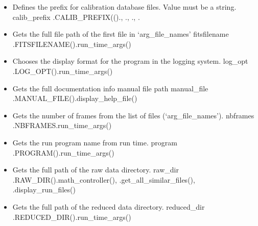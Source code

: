 \begin{itemize}
\item {}
{Defines the prefix for calibration database files. Value must be a string.}
{calib\_prefix}
{\AllRecipes}{\spirouConst.CALIB\_PREFIX(()}{\calDARK.\progMAIN, \callocRAW.\progMAIN, \calSLIT.\progMAIN, \calFFraw.\progMAIN}


\item {}
{Gets the full file path of the first file in `arg\_file\_names'}
{fitsfilename}
{\AllRecipes}{\spirouConst.FITSFILENAME()}{\spirouStartup.run\_time\_args()}


\item {}
{Chooses the display format for the program in the logging system.}
{log\_opt}
{\AllRecipes}{\spirouConst.LOG\_OPT()}{\spirouStartup.run\_time\_args()}


\item {}
{Gets the full documentation info manual file path}
{manual\_file}
{\AllRecipes}{\spirouConst.MANUAL\_FILE()}{\spirouStartup.display\_help\_file()}


\item {}
{Gets the number of frames from the list of files (`arg\_file\_names').}
{nbframes}
{\AllRecipes}{\spirouConst.NBFRAMES}{\spirouStartup.run\_time\_args()}


\item {}
{Gets the run program name from run time.}
{program}
{\AllRecipes}{\spirouConst.PROGRAM()}{\spirouStartup.run\_time\_args()}


\item {}
{Gets the full path of the raw data directory.}
{raw\_dir}
{\AllRecipes}{\spirouConst.RAW\_DIR()}{\spirouFITS.math\_controller(), \spirouImage.get\_all\_similar\_files(), \spirouStartup.display\_run\_files()}


\item {}
{Gets the full path of the reduced data directory.}
{reduced\_dir}
{\AllRecipes}{\spirouConst.REDUCED\_DIR()}{\spirouStartup.run\_time\_args()}

\end{itemize}

\fi








